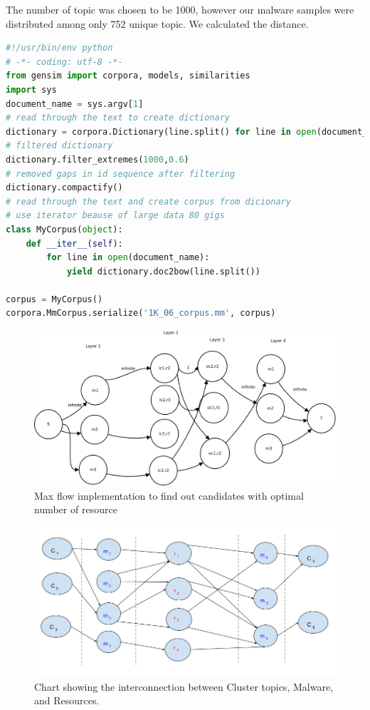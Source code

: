 The number of topic was chosen to be 1000, however our malware samples were distributed among only 752 unique topic.
We calculated the distance.
\begin{lstlisting}[language=python,caption={Script to run Gensim LDA},label={lbl:lda.py}]
#!/usr/bin/env python
# -*- coding: utf-8 -*-
from gensim import corpora, models, similarities
import sys
document_name = sys.argv[1]
# read through the text to create dictionary
dictionary = corpora.Dictionary(line.split() for line in open(document_name))
# filtered dictionary
dictionary.filter_extremes(1000,0.6)
# removed gaps in id sequence after filtering
dictionary.compactify()
# read through the text and create corpus from dicionary
# use iterator beause of large data 80 gigs
class MyCorpus(object):
    def __iter__(self):
        for line in open(document_name):
            yield dictionary.doc2bow(line.split())

corpus = MyCorpus()
corpora.MmCorpus.serialize('1K_06_corpus.mm', corpus)
\end{lstlisting}






\begin{figure}[htbp]
  \centering
  \includegraphics[scale=0.23]{figures/maxflow.png}
  \caption[Big Picture]{Max flow implementation to find out candidates with optimal number of resource}\label{fig:maxflow}
\end{figure}

\begin{figure}[htbp]
  \centering
  \includegraphics[scale=0.45]{figures/dhkherusitcs.png}
  \caption[Cluster, Malware, Resource relation chart]{Chart showing the interconnection between Cluster topics, Malware, and Resources.}\label{fig:dhkheuristics}
\end{figure}
